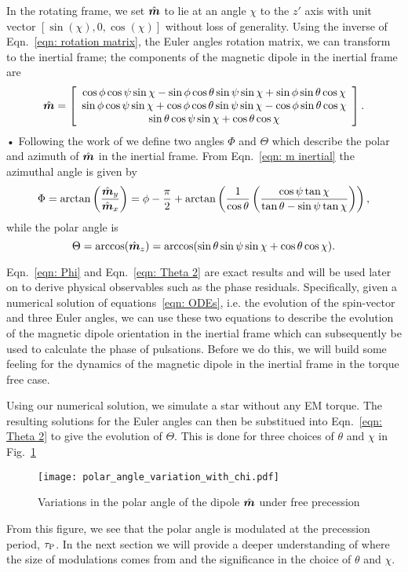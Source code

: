 \documentclass[../full_thesis/full_thesis.tex]{subfiles}
\begin{document}
In the rotating frame, we set $\hat{\boldsymbol{m}}$ to lie at an angle $\chi$ to the $z'$ axis
with unit vector $[\sin(\chi), 0, \cos(\chi)]$ without loss of generality.
Using the inverse of Eqn.~\eqref{eqn: rotation matrix}, the Euler angles
rotation matrix, we can transform to the inertial frame; the components of the
magnetic dipole in the inertial frame are
\begin{equation}
\hat{\boldsymbol{m}} =
\left[\begin{array}{c}
\cos\phi\cos\psi\sin\chi - \sin\phi \cos \theta \sin \psi \sin \chi
+ \sin \phi \sin \theta \cos \chi \\
\sin\phi\cos\psi\sin\chi + \cos\phi \cos \theta \sin \psi \sin \chi
- \cos \phi \sin \theta \cos \chi \\
\sin\theta \cos\psi \sin\chi + \cos\theta \cos \chi
\end{array}\right].
\label{eqn: m inertial}
\end{equation}•
Following the work of \citet{Jones2001} we define two angles $\Phi$ and $\Theta$
which describe the polar and azimuth of $\hat{\boldsymbol{m}}$ in the inertial frame.
From Eqn.~\eqref{eqn: m inertial} the azimuthal angle is given by
\begin{equation}
    \Phi = \arctan\left(\frac{\hat{\boldsymbol{m}}_{y}}{\hat{\boldsymbol{m}}_{x}}\right) =
\phi - \frac{\pi}{2} + \arctan\left(\frac{1}{\cos\theta}
                       \left(\frac{\cos\psi \tan \chi}{\tan\theta -
                       \sin \psi \tan\chi }\right)\right),
\label{eqn: Phi}
\end{equation}
while the polar angle is
\begin{equation}
\Theta = \arccos(\hat{\boldsymbol{m}}_{z}) = \arccos(\sin \theta \sin \psi \sin \chi + \cos \theta \cos \chi ).
\label{eqn: Theta 2}
\end{equation}

Eqn.~\eqref{eqn: Phi} and Eqn.~\eqref{eqn: Theta 2} are exact results and will
be used later on to derive physical observables such as the phase residuals.
Specifically, given a numerical solution of equations~\eqref{eqn: ODEs}, i.e.
the evolution of the spin-vector and three Euler angles, we can use these two
equations to describe the evolution of the magnetic dipole orientation in the
inertial frame which can subsequently be used to calculate the phase of
pulsations. Before we do this, we will build some feeling for the dynamics of
the magnetic dipole in the inertial frame in the torque free case.

Using our numerical solution, we simulate a star without any EM torque. The
resulting solutions for the Euler angles can then be substitued into Eqn.~\eqref{eqn: Theta 2}
to give the evolution of $\Theta$. This is done for three choices of $\theta$
and $\chi$ in Fig.~\ref{fig: polar angle variations}
\begin{figure}[htb]
\centering
  \texttt{[image: polar\_angle\_variation\_with\_chi.pdf]}
\caption{Variations in the polar angle of the dipole $\hat{\boldsymbol{m}}$ under free precession}
\label{fig: polar angle variations}
\end{figure}
From this figure, we see that the polar angle is modulated at the precession
period, $\tau_{\mathrm{P}}$. In the next section we will provide a deeper understanding
of where the size of modulations comes from and the significance in the choice
of $\theta$ and $\chi$.
\end{document}
